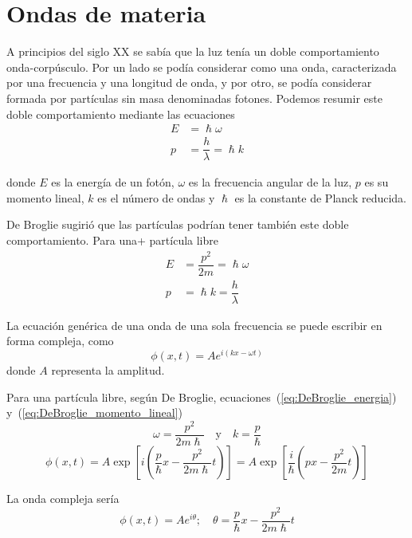 \section{Ondas de materia}
A principios del siglo XX se sabía que la luz tenía un doble
comportamiento onda-corpúsculo. Por un lado se podía considerar como
una onda, caracterizada por una frecuencia y una longitud de onda, y
por otro, se podía considerar formada por partículas sin masa
denominadas fotones. Podemos resumir este doble comportamiento
mediante las ecuaciones
\begin{align*}
  E &= \hslash\omega\\
  p &= \dfrac{\Planckconst}{\lambda} = \hslash k
\end{align*}

donde $E$ es la energía de un fotón, $\omega$ es la frecuencia angular
de la luz, $p$ es su momento lineal, $k$ es el número de ondas y
$\hslash$ es la constante de Planck reducida.

De Broglie sugirió que las partículas podrían tener también este doble
comportamiento. Para una+ partícula libre
\begin{align}\label{eq:DeBroglie_energia}
  E &= \dfrac{p^2}{2m} = \hslash\omega\\
  \label{eq:DeBroglie_momento_lineal}
  p &= \hslash k = \dfrac{\Planckconst}{\lambda}
\end{align}

La ecuación genérica de una onda de una sola frecuencia se puede
escribir en forma compleja, como
\[
  \phi (x,t)
  =
  A e^{i(kx-\omega t)}
\]
donde $A$ representa la amplitud.

Para una partícula libre, según De Broglie,
ecuaciones~(\ref{eq:DeBroglie_energia})
y~(\ref{eq:DeBroglie_momento_lineal})
\[
  \omega = \dfrac{p^2}{2m\hslash}
  \hspace{1em}\text{y}\hspace{1em}
  k = \dfrac{p}{\hslash}
\]
\[
  \phi (x,t)
  =
  A \exp\left[i\left(\dfrac{p}{\hslash}x-\dfrac{p^2}{2m\hslash}t\right)\right]
    =
  A \exp\left[\dfrac{i}{\hslash}\left(px-\dfrac{p^2}{2m}t\right)\right]
\]

La onda compleja sería
\[
  \phi (x,t)
  =
  A e^{i\theta}
  ;\hspace{1em}
  \theta = \dfrac{p}{\hslash} x - \dfrac{p^2}{2m\hslash}t 
\]

